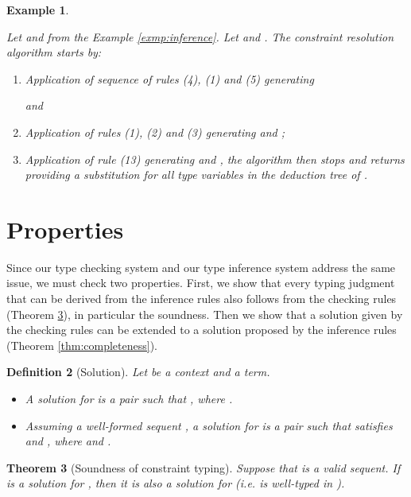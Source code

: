 \documentclass{eptcs}
\newtheorem{thm}{Theorem}[section]
\newtheorem{defn}[thm]{Definition}
\newtheorem{exmp}[thm]{Example}
\begin{document}
\begin{exmp}
\label{exmp:resolution}

Let  and
 from the Example
\ref{exmp:inference}. Let  and . The constraint resolution algorithm
starts by:  
\begin{enumerate}
\item Application of sequence of rules (4), (1) and (5) generating 

and


\item Application of rules (1), (2) and (3) generating  and ;

\item Application of rule (13) generating  and , the algorithm then stops
and returns  providing a substitution for all type variables in
the deduction tree of .
\end{enumerate}
\end{exmp}



\section{Properties}
\label{sec:properties}

Since our type checking system and our type inference system address the same
issue, we must
check two properties. First, we show that every typing judgment that can be
derived from the inference rules also follows from the checking rules (Theorem
\ref{thm:soundness}), in particular the soundness. Then we show that a solution
given by the checking rules
can be extended to a solution proposed by the inference rules (Theorem
\ref{thm:completeness}).

\begin{defn}[Solution]
Let  be a context and  a term. 
\begin{itemize}
\item A {\em solution} for  is a pair  such that , where .
\item Assuming a well-formed sequent , a
{\em solution} for
   is a pair  such that  satisfies  and
  , where  and .
\end{itemize}
\end{defn}

\begin{thm}[Soundness of constraint typing]
\label{thm:soundness}
Suppose that  is a valid sequent. If  is a
solution for , then it is also a solution for
 (i.e.  is well-typed in ).
\end{thm}
\end{document}
